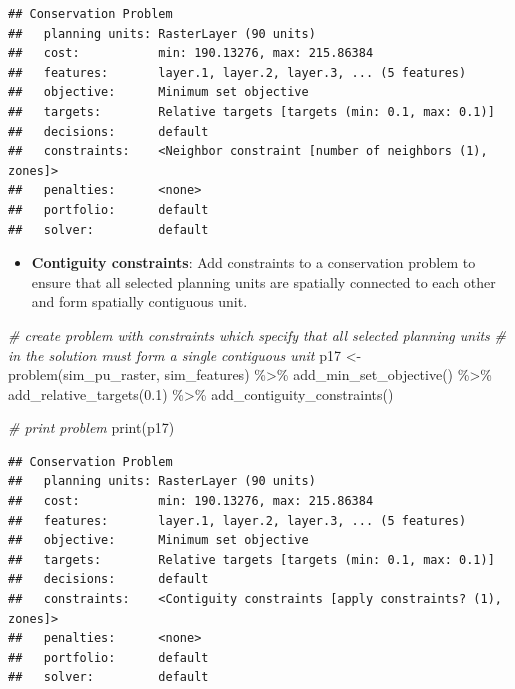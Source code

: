 \documentclass[
  12pt,
]{book}
\newenvironment{Shaded}{\begin{snugshade}}{\end{snugshade}}
\newcommand{\CommentTok}[1]{\textcolor[rgb]{0.56,0.35,0.01}{\textit{#1}}}
\newcommand{\FloatTok}[1]{\textcolor[rgb]{0.00,0.00,0.81}{#1}}
\newcommand{\FunctionTok}[1]{\textcolor[rgb]{0.00,0.00,0.00}{#1}}
\newcommand{\NormalTok}[1]{#1}
\newcommand{\OtherTok}[1]{\textcolor[rgb]{0.56,0.35,0.01}{#1}}
\newcommand{\SpecialCharTok}[1]{\textcolor[rgb]{0.00,0.00,0.00}{#1}}
\providecommand{\tightlist}{%
  \setlength{\itemsep}{0pt}\setlength{\parskip}{0pt}}
\begin{document}
\begin{verbatim}
## Conservation Problem
##   planning units: RasterLayer (90 units)
##   cost:           min: 190.13276, max: 215.86384
##   features:       layer.1, layer.2, layer.3, ... (5 features)
##   objective:      Minimum set objective 
##   targets:        Relative targets [targets (min: 0.1, max: 0.1)]
##   decisions:      default
##   constraints:    <Neighbor constraint [number of neighbors (1), zones]>
##   penalties:      <none>
##   portfolio:      default
##   solver:         default
\end{verbatim}

\begin{itemize}
\tightlist
\item
  \textbf{Contiguity constraints}: Add constraints to a conservation problem to ensure that all selected planning units are spatially connected to each other and form spatially contiguous unit.
\end{itemize}

\begin{Shaded}
\begin{Highlighting}[]
\CommentTok{\# create problem with constraints which specify that all selected planning units}
\CommentTok{\# in the solution must form a single contiguous unit}
\NormalTok{p17 }\OtherTok{\textless{}{-}} \FunctionTok{problem}\NormalTok{(sim\_pu\_raster, sim\_features) }\SpecialCharTok{\%\textgreater{}\%}
  \FunctionTok{add\_min\_set\_objective}\NormalTok{() }\SpecialCharTok{\%\textgreater{}\%}
  \FunctionTok{add\_relative\_targets}\NormalTok{(}\FloatTok{0.1}\NormalTok{) }\SpecialCharTok{\%\textgreater{}\%}
  \FunctionTok{add\_contiguity\_constraints}\NormalTok{()}

\CommentTok{\# print problem}
\FunctionTok{print}\NormalTok{(p17)}
\end{Highlighting}
\end{Shaded}

\begin{verbatim}
## Conservation Problem
##   planning units: RasterLayer (90 units)
##   cost:           min: 190.13276, max: 215.86384
##   features:       layer.1, layer.2, layer.3, ... (5 features)
##   objective:      Minimum set objective 
##   targets:        Relative targets [targets (min: 0.1, max: 0.1)]
##   decisions:      default
##   constraints:    <Contiguity constraints [apply constraints? (1), zones]>
##   penalties:      <none>
##   portfolio:      default
##   solver:         default
\end{verbatim}
\end{document}
